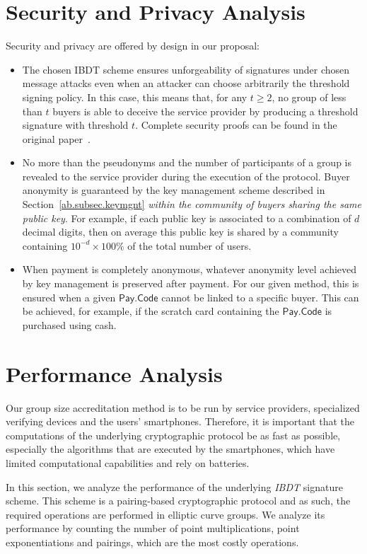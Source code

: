 \documentclass[11pt]{llncs}
\begin{document}
\section{Security and Privacy Analysis}\label{security}

Security and privacy are offered by design in our proposal:
\begin{itemize}
\item The chosen IBDT scheme ensures unforgeability of
signatures under chosen message attacks even when an 
attacker can choose arbitrarily the threshold signing policy. 
In this case, this means that, for any $t \geq 2$,
no group of less than $t$ buyers is able to deceive the
service provider by producing a threshold signature with
threshold $t$. Complete security proofs can be found in
the original paper~\cite{ab.Herranz2012}.
\item No more than the pseudonyms and the number of participants of a group
is revealed to the service provider during the execution of the protocol. 
Buyer anonymity is guaranteed by the key management scheme
described in Section~\ref{ab.subsec.keymgnt} 
{\em within the community of buyers sharing the same public key}.
For example, if each public key is associated to a combination
of $d$ decimal digits, then on average this public key
is shared by a community containing $10^{-d} \times 100 \%$ of 
the total number of users.
\item When payment is completely anonymous, whatever anonymity
level achieved by key management is preserved after payment.
For our given method, this is ensured when a given $\mathsf{Pay.Code}$
cannot be linked to a specific buyer. This can be achieved, for example,
if the scratch card containing the $\mathsf{Pay.Code}$ is purchased using
cash.
\end{itemize}

\section{Performance Analysis}\label{ab.sec.implementation}
Our group size accreditation method is to be run by service
providers, specialized verifying devices and the
users' smartphones.
Therefore, it is important that the computations of the
underlying cryptographic protocol be as fast as
possible, especially the algorithms that are executed
by the smartphones, which have limited computational
capabilities and rely on batteries.

In this section, we analyze the performance of the
underlying \emph{IBDT} signature scheme.
This scheme is a
pairing-based cryptographic protocol and
as such, the required operations are performed in elliptic
curve groups.
We analyze its performance by counting the number
of point multiplications, point exponentiations and
pairings, which are the most costly operations.
\end{document}
